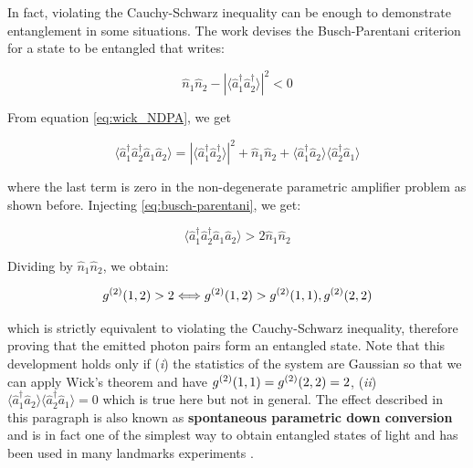 In fact, violating the Cauchy-Schwarz inequality can be enough to demonstrate entanglement in some situations. The work \cite{busch2014quantum} devises the Busch-Parentani criterion for a state to be entangled that writes:

\begin{equation}
    \hat{n}_1 \hat{n}_2 - | \langle \hat{a}^{\dagger}_{1} \hat{a}^{\dagger}_{2} \rangle |^2 < 0
    \label{eq:busch-parentani}
\end{equation}

\noindent From equation \ref{eq:wick_NDPA}, we get

\begin{equation}
    \langle \hat{a}^{\dagger}_{1} \hat{a}^{\dagger}_{2} \hat{a}_{1} \hat{a}_{2} \rangle = | \langle \hat{a}^{\dagger}_{1} \hat{a}^{\dagger}_{2} \rangle |^2 + \hat{n}_1 \hat{n}_2 + \langle \hat{a}^{\dagger}_{1} \hat{a}_{2} \rangle \langle \hat{a}^{\dagger}_{2} \hat{a}_{1} \rangle
\end{equation}

\noindent where the last term is zero in the non-degenerate parametric amplifier problem as shown before. Injecting \ref{eq:busch-parentani}, we get:

\begin{equation}
    \langle \hat{a}^{\dagger}_{1} \hat{a}^{\dagger}_{2} \hat{a}_{1} \hat{a}_{2} \rangle > 2 \hat{n}_1 \hat{n}_2
\end{equation}

\noindent Dividing by  $\hat{n}_1 \hat{n}_2$, we obtain:

\begin{equation}
    g^{(2)} (1,2) > 2 \Longleftrightarrow g^{(2)} (1,2) > g^{(2)} (1,1), g^{(2)} (2,2)
\end{equation}

\noindent which is strictly equivalent to violating the Cauchy-Schwarz inequality, therefore proving that the emitted photon pairs form an entangled state. Note that this development holds only if (\textit{i}) the statistics of the system are Gaussian so that we can apply Wick's theorem and have $g^{(2)} (1,1)=g^{(2)} (2,2)=2$, (\textit{ii}) $\langle \hat{a}^{\dagger}_{1} \hat{a}_{2} \rangle \langle \hat{a}^{\dagger}_{2} \hat{a}_{1} \rangle = 0$ which is true here but not in general. The effect described in this paragraph is also known as \textbf{spontaneous parametric down conversion} and is in fact one of the simplest way to obtain entangled states of light and has been used in many landmarks experiments \cite{burnham1970,heidmann1987observation,rarity1990experimental}.

